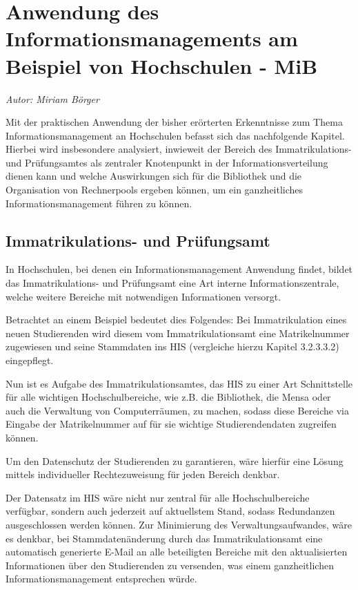 \section{Anwendung des Informationsmanagements am Beispiel von Hochschulen - MiB}
\label{anwendung_des_inm_auf_hs}
\textit{Autor: Miriam Börger}

Mit der praktischen Anwendung der bisher erörterten Erkenntnisse zum Thema 
Informationsmanagement an Hochschulen befasst sich das nachfolgende Kapitel. 
Hierbei wird insbesondere analysiert, inwieweit der Bereich des Immatrikulations- und 
Prüfungsamtes als zentraler Knotenpunkt in der Informationsverteilung dienen kann und 
welche Auswirkungen sich für die Bibliothek und die Organisation von Rechnerpools ergeben 
können, um ein ganzheitliches Informationsmanagement führen zu können.

\subsection{Immatrikulations- und Prüfungsamt}
\label{immatrikulations_und_pruefungsamt}
In Hochschulen, bei denen ein Informationsmanagement Anwendung findet, bildet das Immatrikulations- und Prüfungsamt eine Art interne Informationszentrale, welche weitere Bereiche mit notwendigen Informationen versorgt. 

Betrachtet an einem Beispiel bedeutet dies Folgendes: Bei Immatrikulation eines neuen Studierenden wird diesem vom Immatrikulationsamt eine Matrikelnummer zugewiesen und seine Stammdaten ins HIS (vergleiche hierzu Kapitel 3.2.3.3.2) eingepflegt. 

Nun ist es Aufgabe des Immatrikulationsamtes, das HIS zu einer Art Schnittstelle für alle wichtigen Hochschulbereiche, wie z.B. die Bibliothek, die Mensa oder auch die Verwaltung von Computerräumen, zu machen, sodass diese Bereiche via Eingabe der Matrikelnummer auf für sie wichtige Studierendendaten zugreifen können.

Um den Datenschutz der Studierenden zu garantieren, wäre hierfür eine Lösung mittels individueller Rechtezuweisung für jeden Bereich denkbar.

Der Datensatz im HIS wäre nicht nur zentral für alle Hochschulbereiche verfügbar, sondern 
auch jederzeit auf aktuellstem Stand, sodass Redundanzen ausgeschlossen werden können. 
Zur Minimierung des Verwaltungsaufwandes, wäre es denkbar, bei Stammdatenänderung 
durch das Immatrikulationsamt eine automatisch generierte E-Mail an alle beteiligten 
Bereiche mit den aktualisierten Informationen über den Studierenden zu versenden, was 
einem ganzheitlichen Informationsmanagement entsprechen würde.

